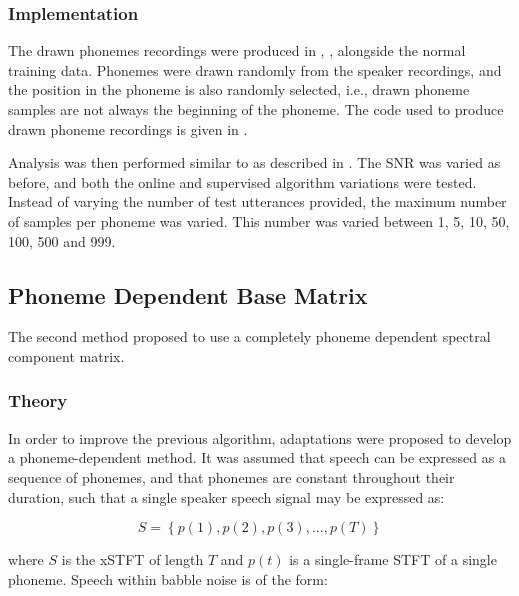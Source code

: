 \subsubsection*{Implementation}

The drawn phonemes recordings were produced in ,
\textit{}, alongside the normal training
data. Phonemes were drawn randomly from the speaker recordings, and
the position in the phoneme is also randomly selected, i.e., drawn
phoneme samples are not always the beginning of the phoneme. The code
used to produce drawn phoneme recordings is given in .


Analysis was then performed similar to as described in .
The \ac{SNR} was varied as before, and both the online and supervised
algorithm variations were tested. Instead of varying the number of
test utterances provided, the maximum number of samples per phoneme
was varied. This number was varied between 1, 5, 10, 50, 100, 500
and 999.


\subsection{\label{sub:Phoneme-Base}Phoneme Dependent Base Matrix}

The second method proposed to use a completely phoneme dependent spectral
component matrix.


\subsubsection*{Theory}

In order to improve the previous algorithm, adaptations were proposed
to develop a phoneme-dependent method. It was assumed that speech
can be expressed as a sequence of phonemes, and that phonemes are
constant throughout their duration, such that a single speaker speech
signal may be expressed as:

\[
S=\left\{ p\left(1\right),p\left(2\right),p\left(3\right),...,p\left(T\right)\right\} 
\]



where $S$ is the x\ac{STFT} of length $T$ and $p\left(t\right)$
is a single-frame \ac{STFT} of a single phoneme. Speech within babble
noise is of the form:


